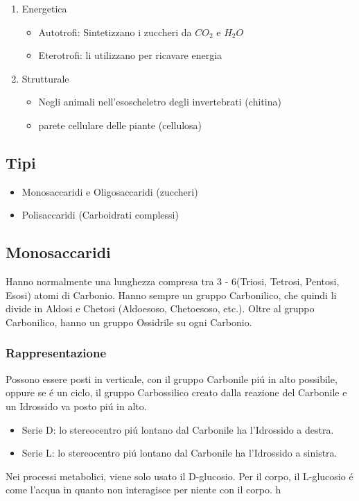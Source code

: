 \documentclass{article}
\begin{document}
\begin{enumerate}
    \item Energetica
    \begin{itemize}
    \item Autotrofi: Sintetizzano i zuccheri da $CO_2$ e $H_2O$
    \item Eterotrofi: li utilizzano per ricavare energia
    \end{itemize}
    \item Strutturale
    \begin{itemize}
        \item Negli animali nell'esoscheletro degli invertebrati (chitina)
        \item parete cellulare delle piante (cellulosa)
    \end{itemize}
\end{enumerate}

\subsection{Tipi}

\begin{itemize}
\item Monosaccaridi e Oligosaccaridi (zuccheri)
\item Polisaccaridi (Carboidrati complessi)
\end{itemize}

\subsection{Monosaccaridi}

Hanno normalmente una lunghezza compresa tra 3 - 6(Triosi, Tetrosi, Pentosi, Esosi) atomi di Carbonio. Hanno sempre un gruppo Carbonilico, che quindi li divide in Aldosi e Chetosi (Aldoesoso, Chetoesoso, etc.). Oltre al gruppo Carbonilico, hanno un gruppo Ossidrile su ogni Carbonio.

\subsubsection{Rappresentazione}

Possono essere posti in verticale, con il gruppo Carbonile piú in alto possibile, oppure se é un ciclo, il gruppo Carbossilico creato dalla reazione del Carbonile e un Idrossido va posto piú in alto.

\begin{itemize}
\item Serie D: lo stereocentro piú lontano dal Carbonile ha l'Idrossido a destra.
\item Serie L: lo stereocentro piú lontano dal Carbonile ha l'Idrossido a sinistra.
\end{itemize}

Nei processi metabolici, viene solo usato il D-glucosio. Per il corpo, il L-glucosio é come l'acqua in quanto non interagisce per niente con il corpo.
h
\end{document}

